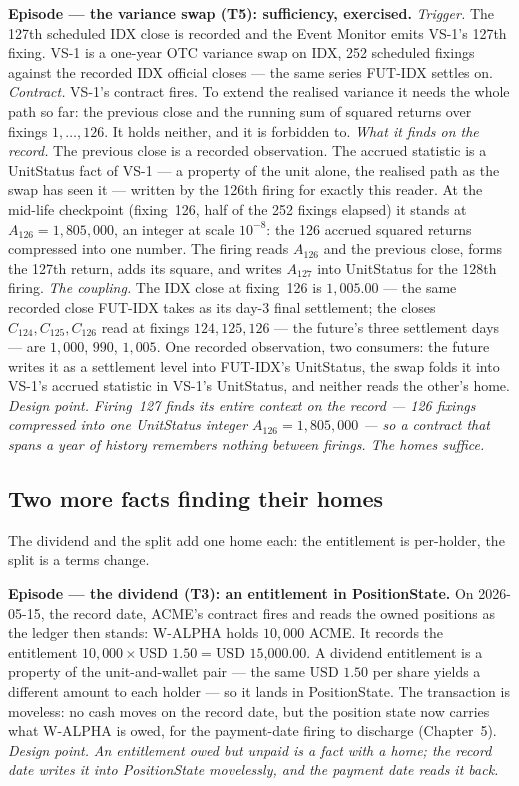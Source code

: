 \documentclass[11pt,a4paper]{article}
\newcommand{\USD}[1]{\mbox{USD~#1}}
\begin{document}
\medskip\noindent\textbf{Episode --- the variance swap (T5): sufficiency, exercised.}
\emph{Trigger.} The 127th scheduled IDX close is recorded and the Event Monitor emits
VS-1's 127th fixing. VS-1 is a one-year OTC variance swap on IDX, 252 scheduled fixings
against the recorded IDX official closes --- the same series FUT-IDX settles on.
\emph{Contract.} VS-1's contract fires. To extend the realised variance it needs the whole
path so far: the previous close and the running sum of squared returns over fixings
$1,\dots,126$. It holds neither, and it is forbidden to.
\emph{What it finds on the record.} The previous close is a recorded observation. The
accrued statistic is a UnitStatus fact of VS-1 --- a property of the unit alone, the
realised path as the swap has seen it --- written by the 126th firing for exactly this
reader. At the mid-life checkpoint (fixing~126, half of the 252 fixings elapsed) it stands
at $A_{126}=1{,}805{,}000$, an integer at scale $10^{-8}$: the 126 accrued squared returns
compressed into one number. The firing reads $A_{126}$ and the previous close, forms the
127th return, adds its square, and writes $A_{127}$ into UnitStatus for the 128th firing.
\emph{The coupling.} The IDX close at fixing~126 is $1{,}005.00$ --- the same recorded
close FUT-IDX takes as its day-3 final settlement; the closes $C_{124},C_{125},C_{126}$ read
at fixings $124,125,126$ --- the future's three settlement days --- are $1{,}000$, $990$, $1{,}005$. One recorded observation, two
consumers: the future writes it as a settlement level into FUT-IDX's UnitStatus, the swap
folds it into VS-1's accrued statistic in VS-1's UnitStatus, and neither reads the other's
home.
\emph{Design point.} \emph{Firing~127 finds its entire context on the record --- 126
fixings compressed into one UnitStatus integer $A_{126}=1{,}805{,}000$ --- so a contract
that spans a year of history remembers nothing between firings. The homes suffice.}

\subsection{Two more facts finding their homes}

The dividend and the split add one home each: the entitlement is per-holder, the split is a
terms change.

\medskip\noindent\textbf{Episode --- the dividend (T3): an entitlement in PositionState.}
On 2026-05-15, the record date, ACME's contract fires and reads the owned positions as the
ledger then stands: W-ALPHA holds $10{,}000$ ACME. It records the entitlement
$10{,}000\times\USD{1.50}=\USD{15{,}000.00}$. A dividend entitlement is a property of the
unit-and-wallet pair --- the same $\USD{1.50}$ per share yields a different amount to each
holder --- so it lands in PositionState. The transaction is moveless: no cash moves on the
record date, but the position state now carries what W-ALPHA is owed, for the payment-date
firing to discharge (Chapter~5).
\emph{Design point.} \emph{An entitlement owed but unpaid is a fact with a home; the record
date writes it into PositionState movelessly, and the payment date reads it back.}
\end{document}
